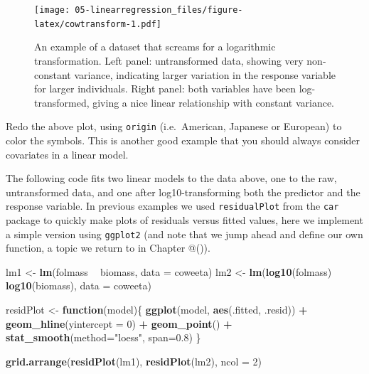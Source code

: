 \documentclass[]{book}
\newenvironment{Shaded}{\begin{snugshade}}{\end{snugshade}}
\newcommand{\ControlFlowTok}[1]{\textcolor[rgb]{0.13,0.29,0.53}{\textbf{#1}}}
\newcommand{\DataTypeTok}[1]{\textcolor[rgb]{0.13,0.29,0.53}{#1}}
\newcommand{\DecValTok}[1]{\textcolor[rgb]{0.00,0.00,0.81}{#1}}
\newcommand{\FloatTok}[1]{\textcolor[rgb]{0.00,0.00,0.81}{#1}}
\newcommand{\KeywordTok}[1]{\textcolor[rgb]{0.13,0.29,0.53}{\textbf{#1}}}
\newcommand{\NormalTok}[1]{#1}
\newcommand{\OperatorTok}[1]{\textcolor[rgb]{0.81,0.36,0.00}{\textbf{#1}}}
\newcommand{\StringTok}[1]{\textcolor[rgb]{0.31,0.60,0.02}{#1}}
\let\BeginKnitrBlock\begin \let\EndKnitrBlock\end
\begin{document}
\begin{figure}
\centering
\texttt{[image: 05-linearregression\_files/figure-latex/cowtransform-1.pdf]}
\caption{\label{fig:cowtransform}An example of a dataset that screams for a logarithmic transformation. Left panel: untransformed data, showing very non-constant variance, indicating larger variation in the response variable for larger individuals. Right panel: both variables have been log-transformed, giving a nice linear relationship with constant variance.}
\end{figure}

\BeginKnitrBlock{rmdtry}
Redo the above plot, using \texttt{origin} (i.e.~American, Japanese or European) to color the symbols. This is another good example that you should always consider covariates in a linear model.
\EndKnitrBlock{rmdtry}

The following code fits two linear models to the data above, one to the raw, untransformed data, and one after log10-transforming both the predictor and the response variable. In previous examples we used \texttt{residualPlot} from the \texttt{car} package to quickly make plots of residuals versus fitted values, here we implement a simple version using \texttt{ggplot2} (and note that we jump ahead and define our own function, a topic we return to in Chapter @()).

\begin{Shaded}
\begin{Highlighting}[]
\NormalTok{lm1 <-}\StringTok{ }\KeywordTok{lm}\NormalTok{(folmass }\OperatorTok{~}\StringTok{ }\NormalTok{biomass, }\DataTypeTok{data =}\NormalTok{ coweeta)}
\NormalTok{lm2 <-}\StringTok{ }\KeywordTok{lm}\NormalTok{(}\KeywordTok{log10}\NormalTok{(folmass) }\OperatorTok{~}\StringTok{ }\KeywordTok{log10}\NormalTok{(biomass), }\DataTypeTok{data =}\NormalTok{ coweeta)}

\NormalTok{residPlot <-}\StringTok{ }\ControlFlowTok{function}\NormalTok{(model)\{}
  \KeywordTok{ggplot}\NormalTok{(model, }\KeywordTok{aes}\NormalTok{(.fitted, .resid)) }\OperatorTok{+}\StringTok{ }
\StringTok{    }\KeywordTok{geom_hline}\NormalTok{(}\DataTypeTok{yintercept =} \DecValTok{0}\NormalTok{) }\OperatorTok{+}\StringTok{ }
\StringTok{    }\KeywordTok{geom_point}\NormalTok{() }\OperatorTok{+}
\StringTok{    }\KeywordTok{stat_smooth}\NormalTok{(}\DataTypeTok{method=}\StringTok{"loess"}\NormalTok{, }\DataTypeTok{span=}\FloatTok{0.8}\NormalTok{)}
\NormalTok{\}}

\KeywordTok{grid.arrange}\NormalTok{(}\KeywordTok{residPlot}\NormalTok{(lm1), }\KeywordTok{residPlot}\NormalTok{(lm2), }\DataTypeTok{ncol =} \DecValTok{2}\NormalTok{)}
\end{Highlighting}
\end{Shaded}
\end{document}
